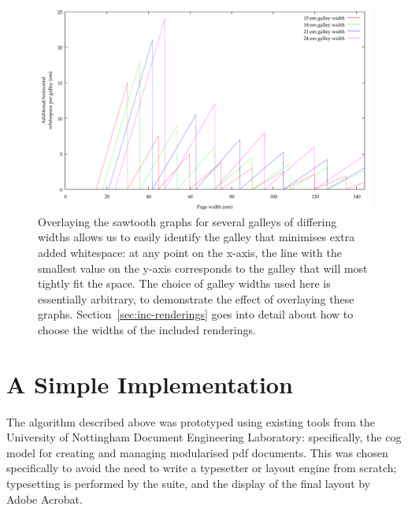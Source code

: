 \begin{figure}
 \includegraphics[height=0.5\textheight]{gnuplot/overlay}
 \caption[Extra whitespace in a multi-galley document]{Overlaying the sawtooth graphs for several galleys of differing widths allows us to easily identify the galley that minimises extra added whitespace: at any point on the x-axis, the line with the smallest value on the y-axis corresponds to the galley that will most tightly fit the space. The choice of galley widths used here is essentially arbitrary, to demonstrate the effect of overlaying these graphs. Section~\ref{sec:inc-renderings} goes into detail about how to choose the widths of the included renderings.}
 \label{fig:overlay}
\end{figure}

\section{A Simple Implementation}
The algorithm described above was prototyped using existing tools from the University of Nottingham Document Engineering Laboratory: specifically, the \gls{cog} model\hspace{0pt}\cite{Bagley2003} for creating and managing modularised \gls{pdf} documents. This was chosen specifically to avoid the need to write a typesetter or layout engine from scratch; typesetting is performed by the \troff{} suite, and the display of the final layout by Adobe Acrobat.  %

